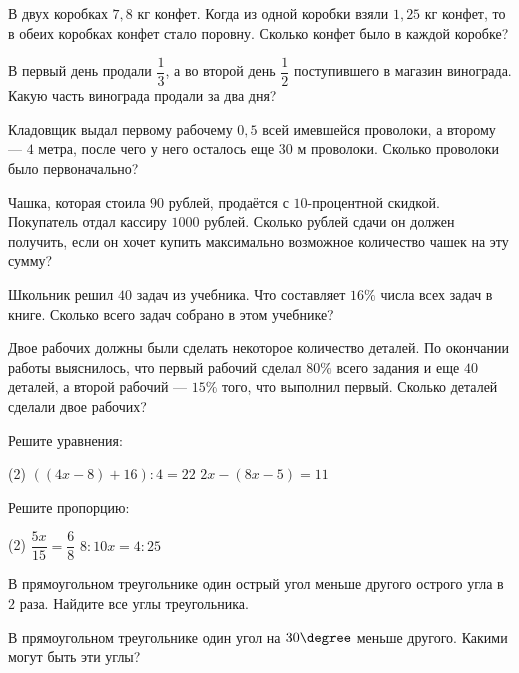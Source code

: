 \begin{class}[number=7]
	\begin{listofex}
		\item В двух коробках \(7,8\) кг конфет. Когда из одной коробки взяли \(1,25\) кг конфет, то в обеих коробках конфет стало поровну. Сколько конфет было в каждой коробке?
		\item В первый день продали \(\dfrac{1}{3}\), а во второй день \(\dfrac{1}{2}\) поступившего в магазин винограда. Какую часть винограда продали за два дня?
		\item Кладовщик выдал первому рабочему \(0,5\) всей имевшейся проволоки, а второму --- \(4\) метра, после чего у него осталось еще \(30\) м проволоки. Сколько проволоки было первоначально?
		\item Чашка, которая стоила \(90\) рублей, продаётся с \(10\)-процентной скидкой. Покупатель отдал кассиру \(1000\) рублей. Сколько рублей сдачи он должен получить, если он хочет купить максимально возможное количество чашек на эту сумму?
		\item Школьник решил \(40\) задач из учебника. Что составляет \(16 \%\) числа всех задач в книге. Сколько всего задач собрано в этом учебнике?
		\item Двое рабочих должны были сделать некоторое количество деталей. По окончании работы выяснилось, что первый рабочий сделал \(80\%\) всего задания и еще \(40\) деталей, а второй рабочий --- \(15\%\) того, что выполнил первый. Сколько деталей сделали двое рабочих?
		\item Решите уравнения:
		\begin{tasks}(2)
			\task \( ((4x-8)+16):4=22\)
			\task \( 2x-(8x-5)=11 \)
		\end{tasks}
		\item Решите пропорцию:
		\begin{tasks}(2)
			\task \( \dfrac{5x}{15}=\dfrac{6}{8} \)
			\task \( 8:10x=4:25\)
		\end{tasks}
		\item В прямоугольном треугольнике один острый угол меньше другого острого угла в \( 2 \) раза. Найдите все углы треугольника.
		\item В прямоугольном треугольнике один угол на \( 30 \degree \) меньше другого. Какими могут быть эти углы?
	\end{listofex}
\end{class}

